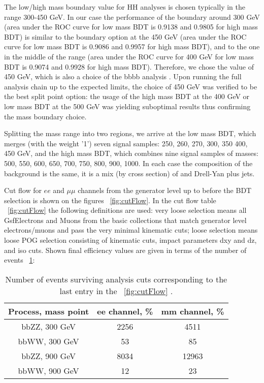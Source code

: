 The low/high mass boundary value for HH analyses is chosen typically in the range 300-450
GeV. In our case the performance of the boundary around 300 GeV (area under the ROC curve
for low mass BDT is 0.9138 and 0.9805 for high mass BDT) is
similar to the boundary option at the 450 GeV (area under the ROC curve
for low mass BDT is 0.9086 and 0.9957 for high mass BDT), and to the one in the
middle of the range (area under the ROC curve
for 400 GeV for low mass BDT is 0.9074 and 0.9928 for high mass BDT). 
Therefore, we chose the value of 450 GeV, which
is also a choice of the bbbb analysis \cite{bbbb}. Upon running the full analysis chain up to the expected limits, the choice of 450 GeV was verified to be the best split point option: the usage of the high mass BDT at the 400 GeV or low mass BDT at the 500 GeV was yielding suboptimal results thus confirming the mass boundary choice. 

Splitting the mass range into two regions, we arrive at the low
mass BDT, which merges (with the weight '1') seven signal samples:
250, 260, 270, 300, 350 400, 450 GeV, and the high mass BDT, which combines nine signal samples of 
masses: 500, 550, 600, 650, 700, 750, 800, 900, 1000. In each case the
composition of the background is the same, it is a mix (by cross
section) of \ttbar and Drell-Yan plus jets.


Cut flow for $ee$ and $\mu\mu$ channels from the generator level up to before the BDT selection is shown on the figures ~\ref{fig:cutFlow}. In the cut flow table ~\ref{fig:cutFlow} the following definitions are used: very loose selection means all GsfElectrons and Muons from the basic collections that match generator level electrons/muons and pass the very minimal kinematic cuts; loose selection means loose POG selection consisting of kinematic cuts, impact parameters dxy and dz, and iso cuts. Shown final efficiency values are given in terms of the number of events ~\ref{cutFlowEvents}:

\begin{table}
\begin{center}
\caption{Number of events surviving analysis cuts corresponding to the last entry in the ~\ref{fig:cutFlow} .}
\begin{tabular}{|c|c|c|} \hline
{Process, mass point} &  ee channel, \% &  mm channel, \% \\\hline
bbZZ, 300 GeV &                    2256     &                    4511 \\
bbWW, 300 GeV &                    53       &                    85 \\
bbZZ, 900 GeV &                    8034     &                    12963 \\
bbWW, 900 GeV &                    12       &                    23 \\\hline
\end{tabular}
\label{cutFlowEvents}
\end{center}
\end{table}



